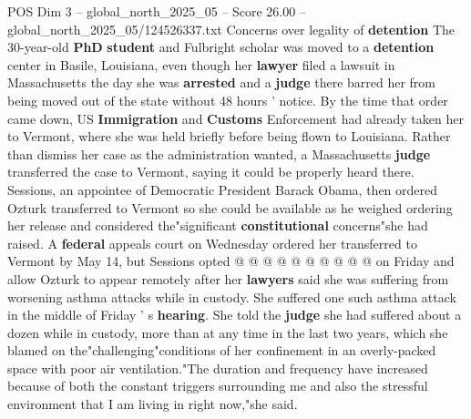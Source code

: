 \begin{textsample}{POS Dim 3 – global\_north\_2025\_05 – Score 26.00 – global\_north\_2025\_05/124526337.txt}
Concerns over legality of \textbf{detention} The 30-year-old \textbf{PhD} \textbf{student} and Fulbright scholar was moved to a \textbf{detention} center in Basile, Louisiana, even though her \textbf{lawyer} filed a lawsuit in Massachusetts the day she was \textbf{arrested} and a \textbf{judge} there barred her from being moved out of the state without 48 hours ' notice.
By the time that order came down, US \textbf{Immigration} and \textbf{Customs} Enforcement had already taken her to Vermont, where she was held briefly before being flown to Louisiana.
Rather than dismiss her case as the administration wanted, a Massachusetts \textbf{judge} transferred the case to Vermont, saying it could be properly heard there.
Sessions, an appointee of Democratic President Barack Obama, then ordered Ozturk transferred to Vermont so she could be available as he weighed ordering her release and considered the"significant \textbf{constitutional} concerns"she had raised.
A \textbf{federal} appeals court on Wednesday ordered her transferred to Vermont by May 14, but Sessions opted @ @ @ @ @ @ @ @ @ @ on Friday and allow Ozturk to appear remotely after her \textbf{lawyers} said she was suffering from worsening asthma attacks while in custody.
She suffered one such asthma attack in the middle of Friday ' s \textbf{hearing}.
She told the \textbf{judge} she had suffered about a dozen while in custody, more than at any time in the last two years, which she blamed on the"challenging"conditions of her confinement in an overly-packed space with poor air ventilation."The duration and frequency have increased because of both the constant triggers surrounding me and also the stressful environment that I am living in right now,"she said.

\end{textsample}
